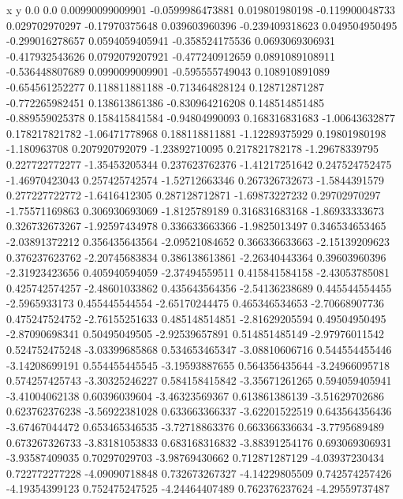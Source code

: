               x                y
            0.0              0.0
0.00990099009901  -0.0599986473881
 0.019801980198  -0.119900048733
 0.029702970297   -0.17970375648
 0.039603960396  -0.239409318623
 0.049504950495  -0.299016278657
0.0594059405941  -0.358524175536
0.0693069306931  -0.417932543626
0.0792079207921  -0.477240912659
0.0891089108911  -0.536448807689
0.0990099009901  -0.595555749043
 0.108910891089  -0.654561252277
 0.118811881188  -0.713464828124
 0.128712871287  -0.772265982451
 0.138613861386  -0.830964216208
 0.148514851485  -0.889559025378
 0.158415841584   -0.94804990093
 0.168316831683   -1.00643632877
 0.178217821782   -1.06471778968
 0.188118811881   -1.12289375929
  0.19801980198     -1.180963708
 0.207920792079   -1.23892710095
 0.217821782178   -1.29678339795
 0.227722772277   -1.35453205344
 0.237623762376   -1.41217251642
 0.247524752475   -1.46970423043
 0.257425742574   -1.52712663346
 0.267326732673    -1.5844391579
 0.277227722772    -1.6416412305
 0.287128712871   -1.69873227232
  0.29702970297   -1.75571169863
 0.306930693069    -1.8125789189
 0.316831683168   -1.86933333673
 0.326732673267   -1.92597434978
 0.336633663366    -1.9825013497
 0.346534653465   -2.03891372212
 0.356435643564   -2.09521084652
 0.366336633663   -2.15139209623
 0.376237623762   -2.20745683834
 0.386138613861   -2.26340443364
  0.39603960396   -2.31923423656
 0.405940594059   -2.37494559511
 0.415841584158   -2.43053785081
 0.425742574257   -2.48601033862
 0.435643564356   -2.54136238689
 0.445544554455    -2.5965933173
 0.455445544554   -2.65170244475
 0.465346534653   -2.70668907736
 0.475247524752   -2.76155251633
 0.485148514851   -2.81629205594
  0.49504950495   -2.87090698341
  0.50495049505   -2.92539657891
 0.514851485149   -2.97976011542
 0.524752475248   -3.03399685868
 0.534653465347   -3.08810606716
 0.544554455446   -3.14208699191
 0.554455445545   -3.19593887655
 0.564356435644   -3.24966095718
 0.574257425743   -3.30325246227
 0.584158415842   -3.35671261265
 0.594059405941   -3.41004062138
  0.60396039604   -3.46323569367
 0.613861386139   -3.51629702686
 0.623762376238   -3.56922381028
 0.633663366337   -3.62201522519
 0.643564356436   -3.67467044472
 0.653465346535   -3.72718863376
 0.663366336634    -3.7795689489
 0.673267326733   -3.83181053833
 0.683168316832   -3.88391254176
 0.693069306931   -3.93587409035
  0.70297029703   -3.98769430662
 0.712871287129   -4.03937230434
 0.722772277228   -4.09090718848
 0.732673267327   -4.14229805509
 0.742574257426   -4.19354399123
 0.752475247525   -4.24464407489
 0.762376237624   -4.29559737487
